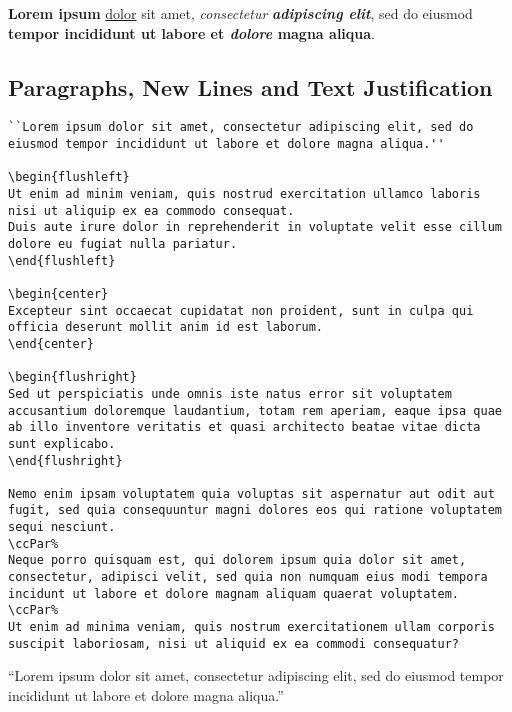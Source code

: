 \textbf{Lorem ipsum} \underline{dolor} sit amet, \textit{consectetur} \textbf{\textit{adipiscing elit}}, sed do eiusmod \textbf{tempor incididunt ut labore et \emph{dolore} magna aliqua}.

\subsection*{Paragraphs, New Lines and Text Justification}%
\label{subsec:paragraphs-new-lines-and-text-justification}

\begin{lstlisting}[caption={Paragraphs, new lines and text justification.}]
``Lorem ipsum dolor sit amet, consectetur adipiscing elit, sed do eiusmod tempor incididunt ut labore et dolore magna aliqua.''

\begin{flushleft}
Ut enim ad minim veniam, quis nostrud exercitation ullamco laboris nisi ut aliquip ex ea commodo consequat.
Duis aute irure dolor in reprehenderit in voluptate velit esse cillum dolore eu fugiat nulla pariatur.
\end{flushleft}

\begin{center}
Excepteur sint occaecat cupidatat non proident, sunt in culpa qui officia deserunt mollit anim id est laborum.
\end{center}

\begin{flushright}
Sed ut perspiciatis unde omnis iste natus error sit voluptatem accusantium doloremque laudantium, totam rem aperiam, eaque ipsa quae ab illo inventore veritatis et quasi architecto beatae vitae dicta sunt explicabo.
\end{flushright}

Nemo enim ipsam voluptatem quia voluptas sit aspernatur aut odit aut fugit, sed quia consequuntur magni dolores eos qui ratione voluptatem sequi nesciunt.
\ccPar%
Neque porro quisquam est, qui dolorem ipsum quia dolor sit amet, consectetur, adipisci velit, sed quia non numquam eius modi tempora incidunt ut labore et dolore magnam aliquam quaerat voluptatem.
\ccPar%
Ut enim ad minima veniam, quis nostrum exercitationem ullam corporis suscipit laboriosam, nisi ut aliquid ex ea commodi consequatur?
\end{lstlisting}

``Lorem ipsum dolor sit amet, consectetur adipiscing elit, sed do eiusmod tempor incididunt ut labore et dolore magna aliqua.''

